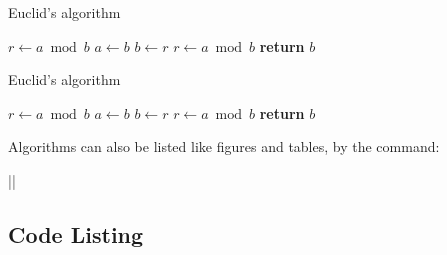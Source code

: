 \begin{frame}[fragile]

\begin{example}
\begin{LCL}
\begin{algorithm}[H]
  \caption{Euclid’s algorithm}
  \label{algorithm:euclid}
  \begin{algorithmic}[1]
    \State $r\gets a\bmod b$
        \State $a\gets b$
        \State $b\gets r$
        \State $r\gets a\bmod b$
      \EndWhile\label{euclidendwhile}
      \State \textbf{return} $b$
    \EndProcedure
  \end{algorithmic}
\end{algorithm}
\end{LCL}
\end{example}

\end{frame}

\begin{frame}[fragile]

\begin{algorithm}[H]
  \caption{Euclid’s algorithm}
  \label{algorithm:euclid}
  \begin{algorithmic}[1]
    \State $r\gets a\bmod b$
        \State $a\gets b$
        \State $b\gets r$
        \State $r\gets a\bmod b$
      \EndWhile\label{euclidendwhile}
      \State \textbf{return} $b$
    \EndProcedure
  \end{algorithmic}
\end{algorithm}

Algorithms can also be listed like figures and tables, by the command:

\begin{command}
\LC|\listofalgorithms|
\end{command}


\end{frame}


\subsection{Code Listing}

